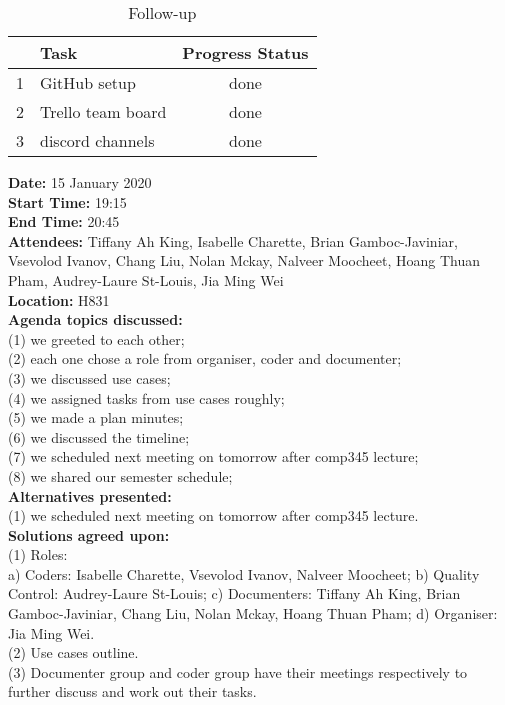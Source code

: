 \documentclass[12pt]{article}
\begin{document}
\begin{table}[h!]
\centering
 \begin{tabular}{||l l c ||} 
 \hline
   & Task & Progress Status\\ [0.5ex] 
 \hline\hline
 1 & GitHub setup & done \\ 
 2 & Trello team board& done\\
 3 & discord channels & done\\[1ex] 

 \hline
 \end{tabular}
\caption{Follow-up }
\label{table:1}
\end{table}

\newpage
{\bf Date:} 15 January 2020\\
{\bf Start Time:} 19:15\\
{\bf End Time:}  20:45\\
{\bf Attendees:} Tiffany Ah King,
Isabelle Charette,
Brian Gamboc-Javiniar,
Vsevolod Ivanov,
Chang Liu,
Nolan Mckay,
Nalveer Moocheet,
Hoang Thuan Pham,
Audrey-Laure St-Louis,
Jia Ming Wei\\
{\bf Location:} H831\\
{\bf Agenda topics discussed:} \\
 (1) we greeted to each other; \\(2) each one chose a role from organiser, coder and documenter; \\(3) we discussed use cases; \\(4) we assigned tasks from use cases roughly; \\(5) we made a plan minutes; \\(6) we discussed the timeline; \\(7) we scheduled next meeting on tomorrow after comp345 lecture; \\(8) we shared our semester schedule; \\
{\bf Alternatives presented:} \\(1) we scheduled next meeting on tomorrow after comp345 lecture.\\
{\bf Solutions agreed upon:} \\(1) Roles:\\a) Coders:
Isabelle Charette,
Vsevolod Ivanov,
Nalveer Moocheet;
b) Quality Control: Audrey-Laure St-Louis; 
c) Documenters: 
Tiffany Ah King,
Brian Gamboc-Javiniar,
Chang Liu,
Nolan Mckay,
Hoang Thuan Pham;
d) Organiser: Jia Ming Wei.
\\(2) Use cases outline. 
\\(3) Documenter group and coder group have their meetings respectively to further discuss and work out their tasks. \\
\end{document}
